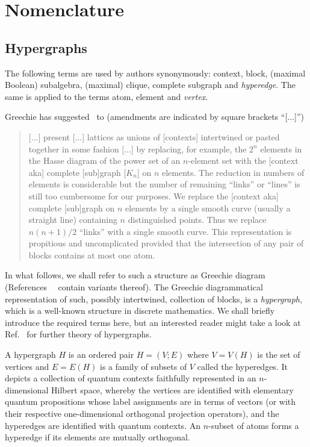 \documentclass[%
12pt,
prereprint,
showpacs,
showkeys,
preprintnumbers,
amsmath,amssymb,
aps,
pra,
longbibliography,
notitlepage
]{revtex4-1}
\theoremstyle{definition}
\begin{document}
	
	
	\section{Nomenclature}
	
	
	\subsection{Hypergraphs}
	
	The following terms are used by authors synonymously:
	context, block, (maximal Boolean) subalgebra, (maximal) clique, complete subgraph and \emph{hyperedge}. The same is applied to the terms atom, element and \emph{vertex}.
	
	Greechie has suggested~\cite{greechie:71} to (amendments are indicated by square brackets ``[$\ldots$]'')
	\begin{quote}
		[$\ldots$]
		present [$\ldots$] lattices as unions of [contexts]
		intertwined or pasted together in some fashion
		[$\ldots$]
		by replacing, for example, the $2^n$ elements in the Hasse diagram of the power set
		of an $n$-element set with the [context aka] complete [sub]graph [$K_n$] on $n$ elements.
		The reduction in numbers of elements is considerable but the number of remaining ``links''
		or ``lines'' is still too cumbersome for our purposes.
		We replace the [context aka] complete [sub]graph on $n$ elements by a single smooth curve (usually a straight line)
		containing $n$ distinguished points. Thus we replace $n(n + 1)/2$ ``links'' with a single smooth curve.
		This representation is propitious and uncomplicated provided that
		the intersection of any pair of blocks contains at most one atom.
	\end{quote}
	
	In what follows, we shall refer to such a structure as {Greechie diagram}~\cite{kalmbach-83} (References~~\cite{Greechie1968,svozil-tkadlec,Mckay2000,Pavicic-2005,Bretto-MR3077516,2018-minimalYIYS}
	contain variants thereof). The Greechie diagrammatical representation of such, possibly intertwined, collection of blocks, is a {\em hypergraph}, which is a well-known structure in discrete mathematics. We shall briefly introduce the required terms here, but an interested reader might take a look at Ref.~\cite{Bretto-MR3077516} for further theory of hypergraphs.
	
	A hypergraph  $H$  is an ordered pair $H=(V ;E)$ where $V=V(H)$ is the set of vertices and $E=E(H)$ is a family of subsets of $V$ called the hyperedges.
	It depicts a collection of quantum contexts faithfully represented in an $n$-dimensional Hilbert space, whereby the vertices are identified with elementary quantum propositions whose label assignments are in terms of vectors (or with their respective one-dimensional orthogonal projection operators), and the hyperedges are identified with quantum contexts. An $n$-subset of atoms forms a hyperedge if its elements are mutually orthogonal.
	
\end{document}
